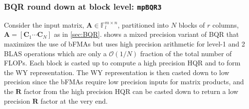 \documentclass[review,onefignum,onetabnum]{siamart190516}
\newcommand{\F}{\mathbb{F}}
\newcommand{\bb}[1]{\mathbf{#1}}
\newcommand{\cO}{\mathcal{O}}
\begin{document}
\subsubsection{BQR round down at block level: {\tt mpBQR3}}\label{sec:mp-3b}
Consider the input matrix, $\bb{A}\in\F_l^{m\times n}$, partitioned into $N$ blocks of $r$ columns, $\bb{A}=[\bb{C}_1 \cdots \bb{C}_N]$ as in \cref{sec:BQR}.
 shows a mixed precision variant of BQR that maximizes the use of bFMAs but uses high precision arithmetic for level-1 and 2 BLAS operations which are only a $\cO(1/N)$ fraction of the total number of FLOPs. 
Each block is casted up to compute a high precision HQR and to form the WY representation. 
The WY representation is then casted down to low precision since the bFMAs require low precision inputs for matrix products, and the $\bb{R}$ factor from the high precision HQR can be casted down to return a low precision $\bb{R}$ factor at the very end. 
\end{document}
